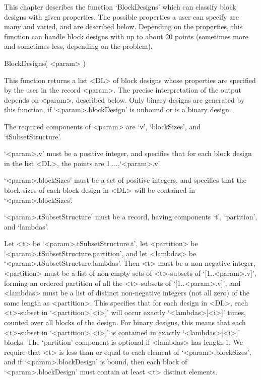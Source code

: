 %
%
%
%
\def\GRAPE{\sf GRAPE}
\def\DESIGN{\sf DESIGN}
\def\nauty{\it nauty}
\def\Aut{{\rm Aut}\,} 


This chapter describes the function `BlockDesigns' which can classify
block designs with given properties.  The possible properties a user
can specify are many and varied, and are described below. Depending on
the properties, this function can handle block designs with up to about
20 points (sometimes more and sometimes less, depending on the problem).


\>BlockDesigns( <param> )

This function returns a list <DL> of block designs whose properties are
specified by the user in the record <param>. The precise interpretation
of the output depends on <param>, described below. Only binary designs
are generated by this function, if `<param>.blockDesign' is unbound
or is a binary design.

The required components of <param> are `v', `blockSizes', and
`tSubsetStructure'.

`<param>.v' must be a positive integer, and specifies that for each block
design in the list <DL>, the points are 1,...,`<param>.v'.

`<param>.blockSizes' must be a set of positive integers, and specifies
that the block sizes of each block design in <DL> will be contained in
`<param>.blockSizes'.

`<param>.tSubsetStructure' must be a record, having components `t',
`partition', and `lambdas'.

Let <t> be `<param>.tSubsetStructure.t', let <partition>
be `<param>.tSubsetStructure.partition', and let <lambdas> be
`<param>.tSubsetStructure.lambdas'.  Then <t> must be a non-negative
integer, <partition> must be a list of non-empty sets of <t>-subsets of
`[1..<param>.v]', forming an ordered partition of all the <t>-subsets of
`[1..<param>.v]', and <lambdas> must be a list of distinct non-negative
integers (not all zero) of the same length as <partition>. This specifies
that for each design in <DL>, each <t>-subset in `<partition>[<i>]'
will occur exactly `<lambdas>[<i>]' times, counted over all blocks of
the design.  For binary designs, this means that each <t>-subset in
`<partition>[<i>]' is contained in exactly `<lambdas>[<i>]' blocks.
The `partition' component is optional if <lambdas> has length 1.
We require that <t> is less than or equal to each element of
`<param>.blockSizes', and if `<param>.blockDesign' is bound,
then each block of `<param>.blockDesign' must contain at least <t>
distinct elements. 

